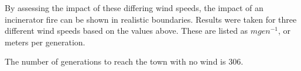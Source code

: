 \documentclass[11pt, a4paper, titlepage]{article}
\begin{document}
  By assessing the impact of these differing wind speeds, the impact of an incinerator fire can be shown in realistic boundaries. Results were taken for three different wind speeds based on the values above. These are listed as $mgen^{-1}$, or meters per generation.

  The number of generations to reach the town with no wind is 306.


  \begin{table}[h]
    \begin{center}

  

\end{center}
\end{table}
\end{document}

